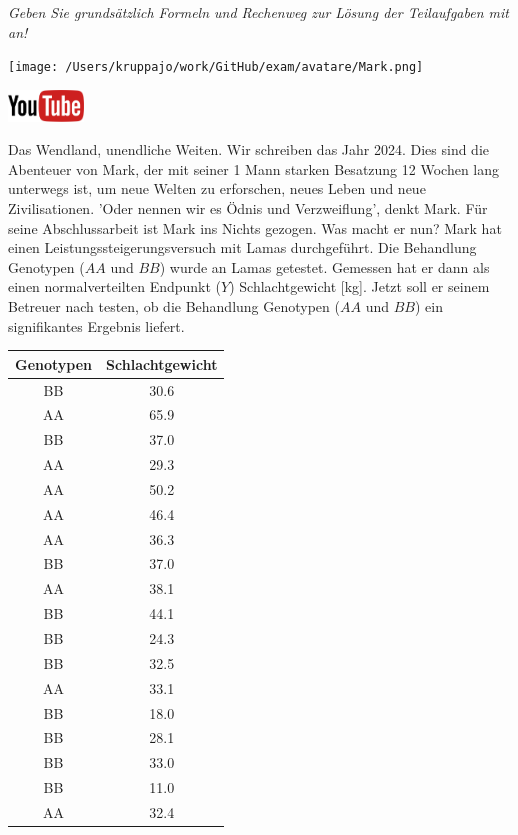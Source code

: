 \documentclass[a4paper, 9pt]{scrartcl}\usepackage[]{graphicx}\usepackage[]{xcolor}
\begin{document}
\textit{Geben Sie grundsätzlich Formeln und Rechenweg zur Lösung der Teilaufgaben mit an!} \\[1Ex]
 

 
\begin{minipage}[t]{0.5\textwidth}
\texttt{[image: /Users/kruppajo/work/GitHub/exam/avatare/Mark.png]}
\end{minipage}
\begin{minipage}[t]{0.5\textwidth}
\hfill
\href{https://youtu.be/Cq_rF_z4xOk}{\includegraphics[width = 2cm]{img/youtube}}\\[1Ex]
\end{minipage}
\vspace{1ex}



Das Wendland, unendliche Weiten. Wir schreiben das Jahr 2024. Dies sind die Abenteuer von Mark, der mit seiner 1 Mann starken Besatzung 12 Wochen lang unterwegs ist, um neue Welten zu erforschen, neues Leben und neue Zivilisationen. 'Oder nennen wir es Ödnis und Verzweiflung', denkt Mark. Für seine Abschlussarbeit ist Mark ins Nichts gezogen. Was macht er nun? Mark hat einen Leistungssteigerungsversuch mit Lamas durchgeführt. Die Behandlung Genotypen ($AA$ und $BB$) wurde an Lamas getestet. Gemessen hat er dann als einen normalverteilten Endpunkt ($Y$) Schlachtgewicht [kg]. Jetzt soll er seinem Betreuer nach testen, ob die Behandlung Genotypen ($AA$ und $BB$) ein signifikantes Ergebnis liefert.

\begin{table}[!h]
\centering
\begin{tabular}{cc}
\toprule
Genotypen & Schlachtgewicht\\
\midrule
BB & 30.6\\
AA & 65.9\\
BB & 37.0\\
AA & 29.3\\
AA & 50.2\\
\addlinespace
AA & 46.4\\
AA & 36.3\\
BB & 37.0\\
AA & 38.1\\
BB & 44.1\\
\addlinespace
BB & 24.3\\
BB & 32.5\\
AA & 33.1\\
BB & 18.0\\
BB & 28.1\\
\addlinespace
BB & 33.0\\
BB & 11.0\\
AA & 32.4\\
\bottomrule
\end{tabular}
\end{table}
\end{document}
